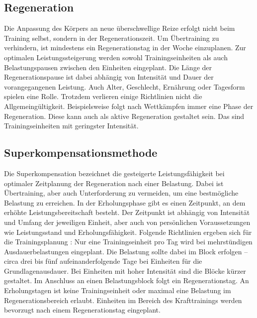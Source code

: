 \subsection{Regeneration}
Die Anpassung des Körpers an neue überschwellige Reize erfolgt nicht beim Training selbst, sondern in der Regenerationszeit. Um Übertraining zu verhindern, ist mindestens ein Regenerationstag in der Woche einzuplanen. \cite{EinfuerungTrainingswissenschaft}
Zur optimalen Leistungssteigerung werden sowohl Trainingseinheiten als auch Belastungspausen zwischen den Einheiten eingeplant. Die Länge der Regenerationspause ist dabei abhängig von Intensität und Dauer der vorangegangenen Leistung. Auch Alter, Geschlecht, Ernährung oder Tagesform spielen eine Rolle. Trotzdem verlieren einige Richtlinien nicht die Allgemeingültigkeit. Beispielsweise folgt nach Wettkämpfen immer eine Phase der Regeneration. Diese kann auch als aktive Regeneration gestaltet sein. Das sind Trainingseinheiten mit geringster Intensität.

\subsection{Superkompensationsmethode}
Die Superkompensation bezeichnet die gesteigerte Leistungsfähigkeit bei optimaler Zeitplanung der Regeneration nach einer Belastung. \cite[163]{Trainingswissenschaft} Dabei ist Übertraining, aber auch Unterforderung zu vermeiden, um eine bestmögliche Belastung zu erreichen. In der Erholungsphase gibt es einen Zeitpunkt, an dem erhöhte Leistungsbereitschaft besteht. Der Zeitpunkt ist abhängig von Intensität und Umfang der jeweiligen Einheit, aber auch von persönlichen Voraussetzungen wie Leistungsstand und Erholungsfähigkeit. \newline
Folgende Richtlinien ergeben sich für die Trainingsplanung \cite[44-46]{Radsporttraining}: Nur eine Trainingseinheit pro Tag wird bei mehrstündigen Ausdauerbelastungen eingeplant. Die Belastung sollte dabei im Block erfolgen -- circa drei bis fünf aufeinanderfolgende Tage bei Einheiten für die Grundlagenausdauer. Bei Einheiten mit hoher Intensität sind die Blöcke kürzer gestaltet. Im Anschluss an einen Belastungsblock folgt ein Regenerationstag. An Erholungstagen ist keine Trainingseinheit oder maximal eine Belastung im Regenerationsbereich erlaubt. Einheiten im Bereich des Krafttrainings werden bevorzugt nach einem Regenerationstag eingeplant. \cite[60]{Radsporttraining}

